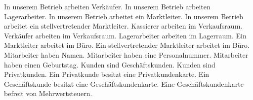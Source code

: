 \documentclass[a4paper,10pt]{scrartcl}
\begin{document}
In unserem Betrieb arbeiten Verkäufer.\newline
In unserem Betrieb arbeiten Lagerarbeiter.\newline
In unserem Betrieb arbeitet ein Marktleiter.\newline
In unserem Betrieb arbeitet ein stellvertretender Marktleiter.\newline
\newline
Kassierer arbeiten im Verkaufsraum.\newline
Verkäufer arbeiten im Verkaufsraum.\newline
Lagerarbeiter arbeiten im Lagerraum.\newline
Ein Marktleiter arbeitet im Büro.\newline
Ein stellvertretender Marktleiter arbeitet im Büro.\newline
\newline
Mitarbeiter haben Namen.\newline
Mitarbeiter haben eine Personalnummer.\newline
Mitarbeiter haben einen Geburtstag.\newline
\newline
Kunden sind Geschäftskunden.\newline
Kunden sind Privatkunden.\newline
\newline
Ein Privatkunde besitzt eine Privatkundenkarte.\newline
Ein Geschäftskunde besitzt eine Geschäftskundenkarte.\newline
Eine Geschäftskundenkarte befreit von Mehrwertsteuern.\newline
\end{document}
